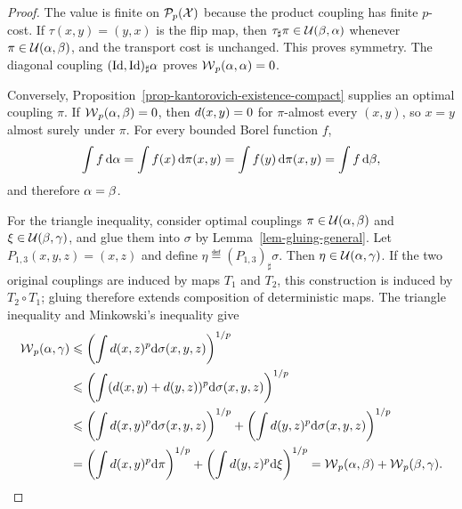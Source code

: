 \begin{proof}
	The value is finite on $\mathcal{P}_p(\mathcal{X})$ because the product coupling has finite $p$-cost. If $\tau(x,y)=(y,x)$ is the flip map, then $\tau_\sharp\pi\in\mathcal{U}(\beta,\alpha)$ whenever $\pi\in\mathcal{U}(\alpha,\beta)$, and the transport cost is unchanged. This proves symmetry. The diagonal coupling $(\mathrm{Id},\mathrm{Id})_\sharp\alpha$ proves $\operatorname{\mathcal{W}}_p(\alpha,\alpha)=0$.

	Conversely, Proposition~\ref{prop-kantorovich-existence-compact} supplies an optimal coupling $\pi$. If $\operatorname{\mathcal{W}}_p(\alpha,\beta)=0$, then $d(x,y)=0$ for $\pi$-almost every $(x,y)$, so $x=y$ almost surely under $\pi$. For every bounded Borel function $f$,
	\[
		\int f\,\mathrm{d}\alpha
		=
		\int f(x)\,\mathrm{d}\pi(x,y)
		=
		\int f(y)\,\mathrm{d}\pi(x,y)
		=
		\int f\,\mathrm{d}\beta,
	\]
	and therefore $\alpha=\beta$.

	For the triangle inequality, consider optimal couplings $\pi\in\mathcal{U}(\alpha,\beta)$ and $\xi\in\mathcal{U}(\beta,\gamma)$,
	and glue them into $\sigma$ by Lemma~\ref{lem-gluing-general}. Let $P_{1,3}(x,y,z)=(x,z)$ and define $\eta\eqdef(P_{1,3})_\sharp\sigma$. Then $\eta\in\mathcal{U}(\alpha,\gamma)$. If the two original couplings are induced by maps $T_1$ and $T_2$, this construction is induced by $T_2\circ T_1$; gluing therefore extends composition of deterministic maps.
	The triangle inequality and Minkowski's inequality give
	\[
	\begin{aligned}
		\operatorname{\mathcal{W}}_p(\alpha,\gamma)
		&\leqslant\left(\int d(x,z)^p\mathrm{d}\sigma(x,y,z)\right)^{1/p}\\
		&\leqslant\left(\int(d(x,y)+d(y,z))^p\mathrm{d}\sigma(x,y,z)\right)^{1/p}\\
		&\leqslant\left(\int d(x,y)^p\mathrm{d}\sigma(x,y,z)\right)^{1/p}
		+\left(\int d(y,z)^p\mathrm{d}\sigma(x,y,z)\right)^{1/p}\\
		&=\left(\int d(x,y)^p\mathrm{d}\pi\right)^{1/p}
		+\left(\int d(y,z)^p\mathrm{d}\xi\right)^{1/p}
		=\operatorname{\mathcal{W}}_p(\alpha,\beta)+\operatorname{\mathcal{W}}_p(\beta,\gamma).
	\end{aligned}
	\]
\end{proof}

